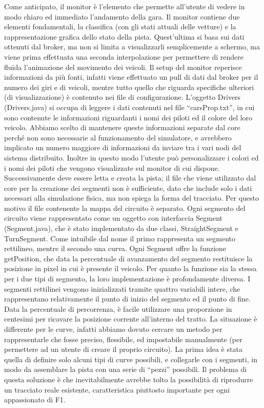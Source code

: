 Come anticipato, il monitor è l’elemento che permette all’utente di vedere in modo chiaro ed immediato l’andamento della gara.
Il monitor contiene due elementi fondamentali, la classifica (con gli stati attuali delle vetture) e la rappresentazione grafica dello stato della pista. Quest’ultima si basa sui dati ottenuti dal broker, ma non si limita a visualizzarli semplicemente a schermo, ma viene prima effettuata una seconda interpolazione per permettere di rendere fluida l’animazione del movimento dei veicoli.
Il setup del monitor reperisce informazioni da più fonti, infatti viene effettuato un pull di dati dal broker per il numero dei giri e di veicoli, mentre tutto quello che riguarda specifiche ulteriori (di visualizzazione) è contenuto nei file di configurazione. L’oggetto Drivers (Drivers.java) si occupa di leggere i dati contenuti nel file “carsProp.txt”, in cui sono contenute le informazioni riguardanti i nomi dei piloti ed il colore del loro veicolo. Abbiamo scelto di mantenere queste informazioni separate dal core perché non sono necessarie al funzionamento del simulatore, e avrebbero implicato un numero maggiore di informazioni da inviare tra i vari nodi del sistema distribuito. Inoltre in questo modo l’utente può personalizzare i colori ed i nomi dei piloti che vengono visualizzate sul monitor di cui dispone.
Successivamente deve essere letta e creata la pista; il file che viene utilizzato dal core per la creazione dei segmenti non è sufficiente, dato che include solo i dati necessari alla simulazione fisica, ma non spiega la forma del tracciato. Per questo motivo il file contenente la mappa del circuito è separato. Ogni segmento del circuito viene rappresentato come un oggetto con interfaccia Segment (Segment.java), che è stato implementato da due classi, StraightSegment e TurnSegment. Come intuibile dal nome il primo rappresenta un segmento rettilineo, mentre il secondo una curva. Ogni Segment offre la funzione getPosition, che data la percentuale di avanzamento del segmento restituisce la posizione in pixel in cui è presente il veicolo. Per quanto la funzione sia la stessa per i due tipi di segmento, la loro implementazione è profondamente diversa.
I segmenti rettilinei vengono inizializzati tramite quattro variabili intere, che rappresentano relativamente il punto di inizio del segmento ed il punto di fine. Data la percentuale di percorrenza, è facile utilizzare una proporzione in centesimi per ricavare la posizione corrente all’interno del tratto.
La situazione è differente per le curve, infatti abbiamo dovuto cercare un metodo per rappresentarle che fosse preciso, flessibile, ed impostabile manualmente (per permettere ad un utente di creare il proprio circuito). La prima idea è stata quella di definire solo alcuni tipi di curve possibili, e collegarle con i segmenti, in modo da assemblare la pista con una serie di “pezzi” possibili. Il problema di questa soluzione è che inevitabilmente avrebbe tolto la possibilità di riprodurre un tracciato reale esistente, caratteristica piuttosto importante per ogni appassionato di F1.
